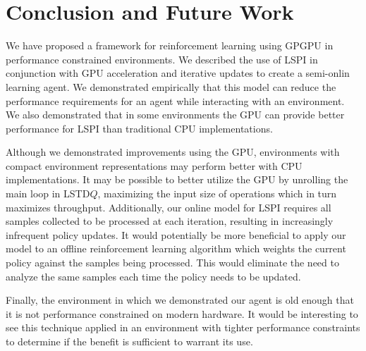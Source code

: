 \chapter{Conclusion and Future Work}
\label{chap:conclusion}

We have proposed a framework for reinforcement learning using GPGPU in performance constrained environments. We described the use of LSPI in conjunction with GPU acceleration and iterative updates to create a semi-onlin learning agent. We demonstrated empirically that this model can reduce the performance requirements for an agent while interacting with an environment. We also demonstrated that in some environments the GPU can provide better performance for LSPI than traditional CPU implementations.

Although we demonstrated improvements using the GPU, environments with compact environment representations may perform better with CPU implementations. It may be possible to better utilize the GPU by unrolling the main loop in LSTD$Q$, maximizing the input size of operations which in turn maximizes throughput. Additionally, our online model for LSPI requires all samples collected to be processed at each iteration, resulting in increasingly infrequent policy updates. It would potentially be more beneficial to apply our model to an offline reinforcement learning algorithm which weights the current policy against the samples being processed. This would eliminate the need to analyze the same samples each time the policy needs to be updated.

Finally, the environment in which we demonstrated our agent is old enough that it is not performance constrained on modern hardware. It would be interesting to see this technique applied in an environment with tighter performance constraints to determine if the benefit is sufficient to warrant its use.